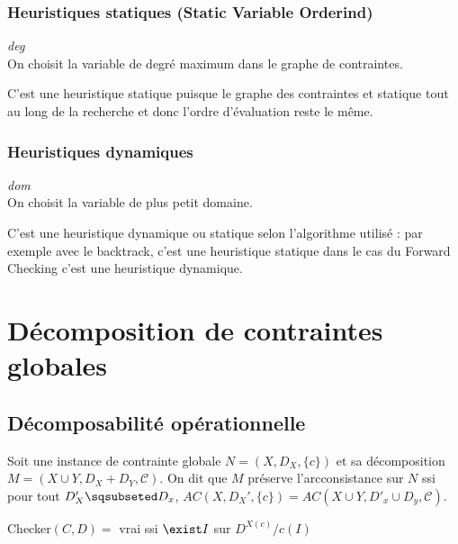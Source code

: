 \subsubsection{Heuristiques statiques (Static Variable Orderind)}

\begin{df}
    \emph{deg} \\
    On choisit la variable de degré maximum dans le graphe de contraintes.
\end{df}

C'est une heuristique statique puisque le graphe des contraintes et statique tout au long de la
recherche et donc l'ordre d'évaluation reste le même.

\subsubsection{Heuristiques dynamiques}

\begin{df}
    \emph{dom}\\
    On choisit la variable de plus petit domaine.
\end{df}

C'est une heuristique dynamique ou statique selon l'algorithme utilisé : par exemple avec le
backtrack, c'est une heuristique statique dans le cas du Forward Checking c'est une heuristique
dynamique.

\section{Décomposition de contraintes globales}

\subsection{Décomposabilité opérationnelle}

\begin{df}
    Soit une instance de contrainte globale $N = (X, D_X, \{c\})$ et sa décomposition $M = (X \cup Y, D_X +
    D_Y, \mathcal{C})$. On dit que $M$ préserve l'arcconsistance sur $N$ ssi pour tout $D'_X
    \sqsubseted D_x$, $AC(X, D_X', \{c\}) = AC(X \cup Y, D'_x \cup D_y, \mathcal{C})$.
\end{df}

\begin{df}
    Checker$(C, D) =$ vrai ssi $\exist I$ sur $D^{X(c)} / c(I)$
\end{df}



